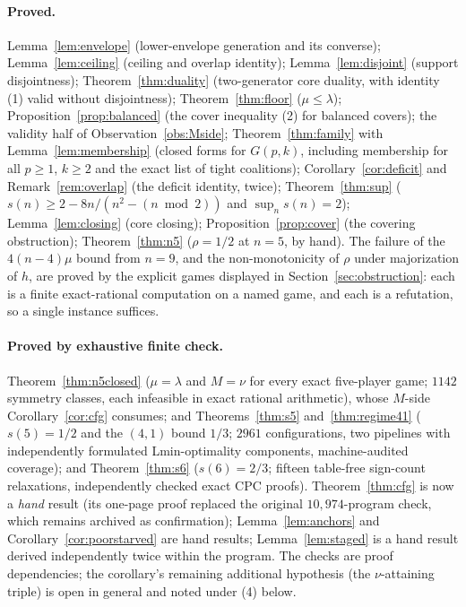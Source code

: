 \documentclass[11pt]{article}
\begin{document}
\paragraph{Proved.}
Lemma~\ref{lem:envelope} (lower-envelope generation and its converse);
Lemma~\ref{lem:ceiling} (ceiling and overlap identity);
Lemma~\ref{lem:disjoint} (support disjointness); Theorem~\ref{thm:duality}
(two-generator core duality, with identity (1) valid without disjointness);
Theorem~\ref{thm:floor} ($\mu\le\lambda$); Proposition~\ref{prop:balanced}
(the cover inequality (2) for balanced covers); the validity half of
Observation~\ref{obs:Mside}; Theorem~\ref{thm:family} with
Lemma~\ref{lem:membership} (closed forms for $G(p,k)$, including membership
for all $p\ge1$, $k\ge2$ and the exact list of tight coalitions);
Corollary~\ref{cor:deficit} and Remark~\ref{rem:overlap} (the deficit
identity, twice);  Theorem~\ref{thm:sup} ($s(n)\ge2-8n/(n^2-(n\bmod2))$ and
$\sup_ns(n)=2$); Lemma~\ref{lem:closing} (core closing);
Proposition~\ref{prop:cover} (the covering obstruction);
Theorem~\ref{thm:n5} ($\rho=1/2$ at $n=5$, by hand).  The failure of the
$4(n-4)\mu$ bound from $n=9$, and the non-monotonicity of $\rho$ under
majorization of $h$, are proved by the explicit games displayed in
Section~\ref{sec:obstruction}: each is a finite exact-rational computation on
a named game, and each is a refutation, so a single instance suffices.

\paragraph{Proved by exhaustive finite check.}
Theorem~\ref{thm:n5closed} ($\mu=\lambda$ and $M=\nu$ for every exact
five-player game; $1142$ symmetry classes, each infeasible in exact rational
arithmetic), whose $M$-side Corollary~\ref{cor:cfg} consumes;
and Theorems~\ref{thm:s5} and~\ref{thm:regime41} ($s(5)=1/2$ and the
$(4,1)$ bound $1/3$; $2961$ configurations, two pipelines with independently
formulated Lmin-optimality components, machine-audited coverage); and
Theorem~\ref{thm:s6} ($s(6)=2/3$; fifteen
table-free sign-count relaxations, independently checked exact CPC proofs).
Theorem~\ref{thm:cfg} is now a \emph{hand}
result (its one-page proof replaced the original $10{,}974$-program
check, which remains archived as confirmation);
Lemma~\ref{lem:anchors} and
Corollary~\ref{cor:poorstarved} are hand results; Lemma~\ref{lem:staged} is
a hand result derived independently twice within the program.
The checks are proof dependencies; the corollary's remaining additional
hypothesis (the $\nu$-attaining triple) is open in general and noted
under (4) below.
\end{document}

